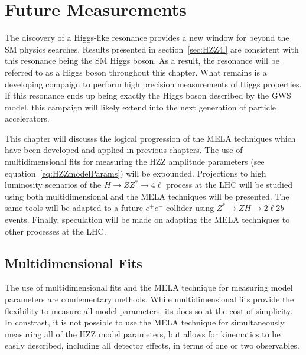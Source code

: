 

\chapter{Future Measurements}
\label{sec:FutureMeasurements}

The discovery of a Higgs-like resonance provides a new window
for beyond the SM physics searches.  Results presented in 
section~\ref{sec:HZZ4l} are consistent with this resonance 
being the SM Higgs boson.  As a result, the resonance will be
referred to as a Higgs boson throughout this chapter. 
What remains is a developing compaign to perform high precision
measurements of Higgs properties.  If this resonance ends up 
being exactly the Higgs boson described by the GWS model, 
this campaign will likely extend into the next generation of 
particle accelerators.  

This chapter will discusss the logical progression of the MELA
techniques which have been developed and applied in previous 
chapters.  The use of multidimensional fits for measuring the 
HZZ amplitude parameters (see
equation~\ref{eq:HZZmodelParams}) will be expounded.  
Projections to high luminosity scenarios of the $H\to ZZ^*\to4\ell$
process at the LHC will be studied using both multidimensional
and the MELA techniques will be presented.  The same tools will
be adapted to a future $e^+e^-$ collider using $Z^*\to ZH\to 2\ell2b$
events.   Finally, speculation will be made on adapting the MELA
techniques to other processes at the LHC.

\section{Multidimensional Fits}

The use of multidimensional fits 
and the MELA technique for measuring model parameters are 
comlementary methods.  While multidimensional fits provide 
the flexibility to measure all model parameters, its does so at
the cost of simplicity. In constrast, it is not possible to use
the MELA 
technique for simultaneously measuring all of the HZZ model 
parameters, but allows for 
kinematics to be easily described, including all detector effects,
in terms of one or two observables. 

